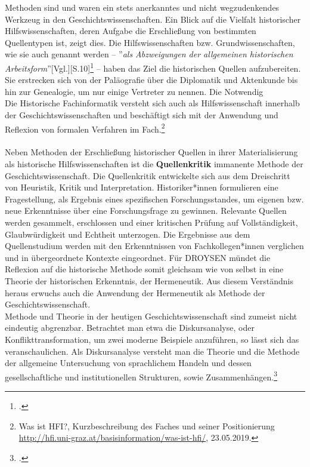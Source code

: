 \documentclass[12pt,a4paper]{article}
\begin{document}
Methoden sind und waren ein stets anerkanntes und nicht wegzudenkendes Werkzeug in den Geschichtswissenschaften. Ein Blick auf die Vielfalt historischer Hilfswissenschaften, deren Aufgabe die Erschließung von bestimmten Quellentypen ist, zeigt dies. Die Hilfswissenschaften bzw. Grundwissenschaften, wie sie auch genannt werden -- ''\textit{als Abzweigungen der allgemeinen historischen Arbeitsform}''[Vgl.][S.10]\footcite{von2007werkzeug} -- haben das Ziel die historischen Quellen aufzubereiten. Sie erstrecken sich von der Paläografie über die Diplomatik und Aktenkunde bis hin zur Genealogie, um nur einige Vertreter zu nennen.  Die Notwendig
\\
Die Historische Fachinformatik versteht sich auch als Hilfswissenschaft innerhalb der Geschichtswissenschaften und beschäftigt sich mit der Anwendung und Reflexion von formalen Verfahren im Fach.\footnote{Was ist HFI?, Kurzbeschreibung des Faches und seiner Positionierung \protect\url{http://hfi.uni-graz.at/basisinformation/was-ist-hfi/}, 23.05.2019.} 
\\
\\
Neben Methoden der Erschließung historischer Quellen in ihrer Materialisierung als historische Hilfswissenschaften ist die \textbf{Quellenkritik} immanente Methode der Geschichtswissenschaft. Die Quellenkritik entwickelte sich aus dem Dreischritt von Heuristik, Kritik und Interpretation. Historiker*innen formulieren eine Fragestellung, als Ergebnis eines spezifischen Forschungsstandes, um eigenen bzw. neue  Erkenntnisse über eine Forschungsfrage zu gewinnen. Relevante Quellen werden gesammelt, erschlossen und einer kritischen Prüfung auf Vollständigkeit, Glaubwürdigkeit und Echtheit unterzogen. Die Ergebnisse aus dem Quellenstudium werden mit den Erkenntnissen von Fachkollegen*innen verglichen und in übergeordnete Kontexte eingeordnet. Für DROYSEN mündet die Reflexion auf die historische Methode somit gleichsam wie von selbst in eine Theorie der historischen Erkenntnis, der Hermeneutik. Aus diesem Verständnis heraus erwuchs auch die Anwendung der Hermeneutik als Methode der Geschichtswissenschaft.
\\
Methode und Theorie in der heutigen Geschichtswissenschaft sind zumeist nicht eindeutig abgrenzbar. Betrachtet man etwa die Diskursanalyse, oder Konflikttransformation, um zwei moderne Beispiele anzuführen, so lässt sich das veranschaulichen. Als Diskursanalyse versteht man die Theorie und die Methode der  allgemeine Untersuchung von sprachlichem Handeln und dessen gesellschaftliche und institutionellen Strukturen, sowie Zusammenhängen.\footcite{jager2000theoretische}
\end{document}
